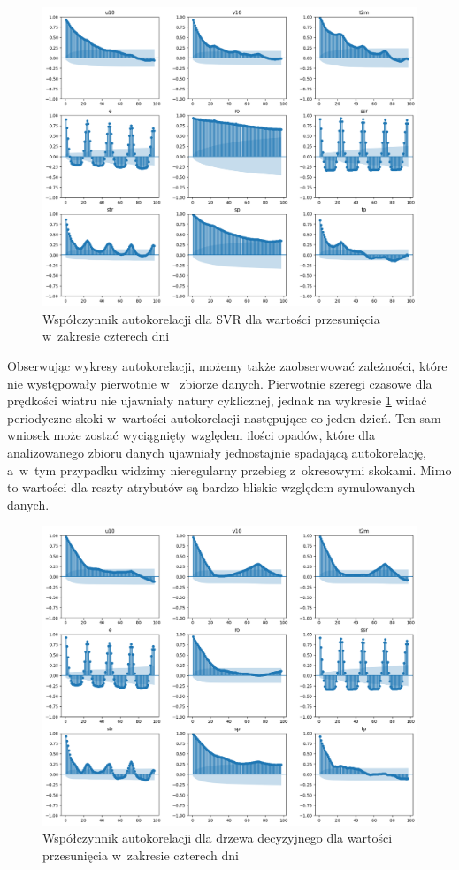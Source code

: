 \begin{figure}[H]
    \centering
    \includegraphics[width=.8\textwidth]{images/svr_autocorr.png}
    \caption{Współczynnik autokorelacji dla SVR dla wartości przesunięcia w~zakresie czterech dni}
    \label{svr-autocorr}
\end{figure}

Obserwując wykresy autokorelacji, możemy także zaobserwować zależności, które nie występowały pierwotnie w~
zbiorze danych. Pierwotnie szeregi czasowe dla prędkości wiatru nie ujawniały natury cyklicznej, jednak 
na wykresie \ref{svr-autocorr} widać periodyczne skoki w~wartości autokorelacji następujące co jeden dzień.
Ten sam wniosek może zostać wyciągnięty względem ilości opadów, które dla analizowanego zbioru danych 
ujawniały jednostajnie spadającą autokorelację, a~w~tym przypadku widzimy nieregularny przebieg z~okresowymi
skokami. Mimo to wartości dla reszty atrybutów są bardzo bliskie względem symulowanych danych.

\begin{figure}[H]
    \centering
    \includegraphics[width=\textwidth]{images/dt_autocorr.png}
    \caption{Współczynnik autokorelacji dla drzewa decyzyjnego dla wartości przesunięcia w~zakresie czterech dni}
    \label{dt-autocorr}
\end{figure}

